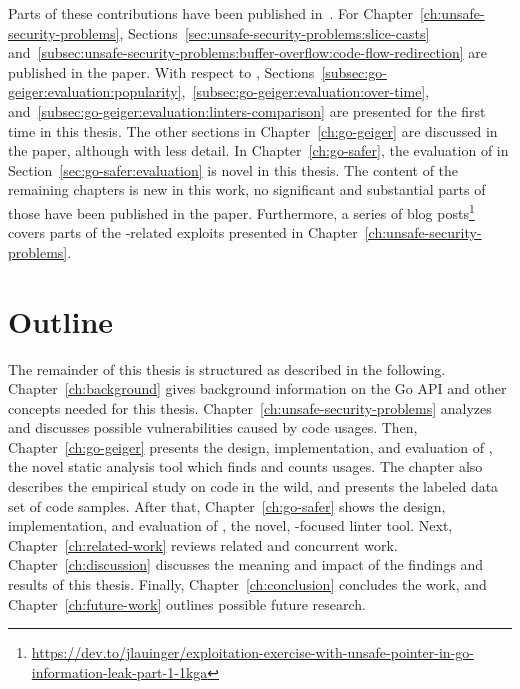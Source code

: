 Parts of these contributions have been published in~\cite{lauinger2020}.
For Chapter~\ref{ch:unsafe-security-problems}, Sections~\ref{sec:unsafe-security-problems:slice-casts}
and~\ref{subsec:unsafe-security-problems:buffer-overflow:code-flow-redirection} are published in the paper.
With respect to \toolGeiger{}, Sections~\ref{subsec:go-geiger:evaluation:popularity},~\ref{subsec:go-geiger:evaluation:over-time},
and~\ref{subsec:go-geiger:evaluation:linters-comparison} are presented for
the first time in this thesis.
The other sections in Chapter~\ref{ch:go-geiger} are discussed in the paper, although with less detail.
In Chapter~\ref{ch:go-safer}, the evaluation of \toolSafer{} in Section~\ref{sec:go-safer:evaluation} is novel in this
thesis.
The content of the remaining chapters is new in this work, no significant and substantial parts of those have been
published in the paper.
Furthermore, a series of blog
posts\footnote{\url{https://dev.to/jlauinger/exploitation-exercise-with-unsafe-pointer-in-go-information-leak-part-1-1kga}}
covers parts of the \unsafe{}-related exploits presented in Chapter~\ref{ch:unsafe-security-problems}.



\section{Outline}\label{sec:introduction:outline}

The remainder of this thesis is structured as described in the following.
Chapter~\ref{ch:background} gives background information on the Go \unsafe{} \acrshort{API} and other concepts needed
for this thesis.
Chapter~\ref{ch:unsafe-security-problems} analyzes and discusses possible vulnerabilities caused by \unsafe{} code
usages.
Then, Chapter~\ref{ch:go-geiger} presents the design, implementation, and evaluation of \toolGeiger, the novel static
analysis tool which finds and counts \unsafe{} usages.
The chapter also describes the empirical study on \unsafe{} code in the wild, and presents the labeled data set of
\unsafe{} code samples.
After that, Chapter~\ref{ch:go-safer} shows the design, implementation, and evaluation of \toolSafer, the novel,
\unsafe{}-focused linter tool.
Next, Chapter~\ref{ch:related-work} reviews related and concurrent work.
Chapter~\ref{ch:discussion} discusses the meaning and impact of the findings and results of this thesis.
Finally, Chapter~\ref{ch:conclusion} concludes the work, and Chapter~\ref{ch:future-work} outlines possible future
research.
